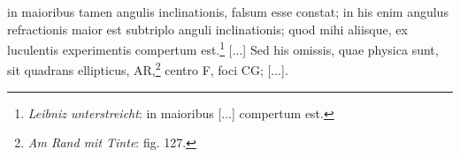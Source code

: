 \pend \pstart [p.~155] [...] in maioribus tamen angulis inclinationis\protect{}, falsum esse constat; in his enim angulus refractionis\protect{} maior est subtriplo anguli inclinationis\protect{}; quod mihi aliisque, ex luculentis experimentis compertum est.\footnote{\textit{Leibniz unterstreicht}: in maioribus [...] compertum est.} [...] Sed his omissis, quae physica sunt, sit quadrans ellipticus, AR,\footnote{\textit{Am Rand mit Tinte}: fig. 127.} centro F, foci CG; [...].